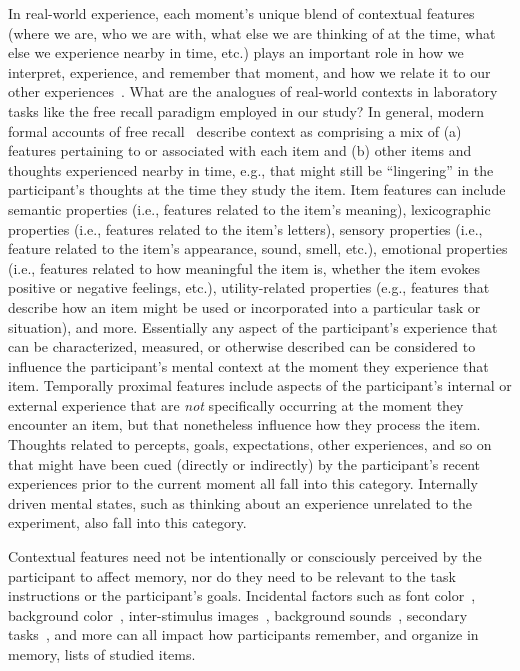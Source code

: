 \documentclass[11pt]{article}
\begin{document}
In real-world experience, each moment's unique blend of contextual features
(where we are, who we are with, what else we are thinking of at the time, what
else we experience nearby in time, etc.) plays an important role in how we
interpret, experience, and remember that moment, and how we relate it to our
other experiences~\citep[e.g., for review see ][]{Mann20}. What are the
analogues of real-world contexts in laboratory tasks like the free recall
paradigm employed in our study? In general, modern formal accounts of free
recall~\citep{Kaha20} describe context as comprising a mix of (a) features
pertaining to or associated with each item and (b) other items and thoughts
experienced nearby in time, e.g., that might still be ``lingering'' in the
participant's thoughts at the time they study the item. Item features can
include semantic properties (i.e., features related to the item's meaning),
lexicographic properties (i.e., features related to the item's letters),
sensory properties (i.e., feature related to the item's appearance, sound,
smell, etc.), emotional properties (i.e., features related to how meaningful the
item is, whether the item evokes positive or negative feelings, etc.),
utility-related properties (e.g., features that describe how an item might be
used or incorporated into a particular task or situation), and more.
Essentially any aspect of the participant's experience that can be
characterized, measured, or otherwise described can be considered to influence
the participant's mental context at the moment they experience that item.
Temporally proximal features include aspects of the participant's internal or
external experience that are \textit{not} specifically occurring at the moment
they encounter an item, but that nonetheless influence how they process the
item. Thoughts related to percepts, goals, expectations, other experiences, and
so on that might have been cued (directly or indirectly) by the participant's
recent experiences prior to the current moment all fall into this category.
Internally driven mental states, such as thinking about an experience unrelated
to the experiment, also fall into this category.

Contextual features need not be intentionally or consciously perceived by the
participant to affect memory, nor do they need to be relevant to the task
instructions or the participant's goals. Incidental factors such as font
color~\citep{JonePyc14}, background color~\citep{IsarIsar07}, inter-stimulus
images~\citep{GersEtal13, MannEtal16, ChiuEtal21}, background
sounds~\citep{BeamJone10, SahaSmit14}, secondary tasks~\citep{MasiSaha14,
PolyEtal09}, and more can all impact how participants remember, and organize in
memory, lists of studied items.
\end{document}
